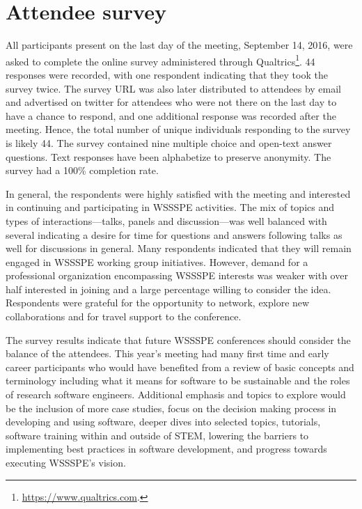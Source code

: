 \documentclass[11pt, oneside]{amsart}
\newcommand{\note}[1]{ {\textcolor{blueish}    { ***Note:      #1 }}}
\begin{document}
\section{Attendee survey \label{sec:survey}}


All participants present on the last day of the meeting, September 14, 2016, were asked to complete the online survey administered through Qualtrics\footnote{\url{https://www.qualtrics.com}.}.
44 responses were recorded, with one respondent indicating that they took the survey twice.
The survey URL was also later distributed to attendees by email and advertised on twitter for attendees who were not there on the last day to have a chance to respond, and one additional response was recorded after the meeting.
Hence, the total number of unique individuals responding to the survey is likely 44.
The survey contained nine multiple choice and open-text answer questions.
Text responses have been alphabetize to preserve anonymity.
The survey had a 100\% completion rate.

In general, the respondents were highly satisfied with the meeting and interested in continuing and participating in WSSSPE activities.
The mix of topics and types of interactions---talks, panels and discussion---was well balanced with several indicating a desire for time for questions and answers following talks as well for discussions in general.
Many respondents indicated that they will remain engaged in WSSSPE working group initiatives.
However, demand for a professional organization encompassing WSSSPE interests was weaker with over half interested in joining and a large percentage willing to consider the idea.
Respondents were grateful for the opportunity to network, explore new collaborations and for travel support to the conference.

The survey results indicate that future WSSSPE conferences should consider the balance of the attendees.
This year's meeting had many first time and early career participants who would have benefited from a review of basic concepts and terminology including what it means for software to be sustainable and the roles of research software engineers.
Additional emphasis and topics to explore would be the inclusion of more case studies, focus on the decision making process in developing and using software, deeper dives into selected topics, tutorials, software training within and outside of STEM, lowering the barriers to implementing best practices in software development, and progress towards executing WSSSPE's vision.
\end{document}
